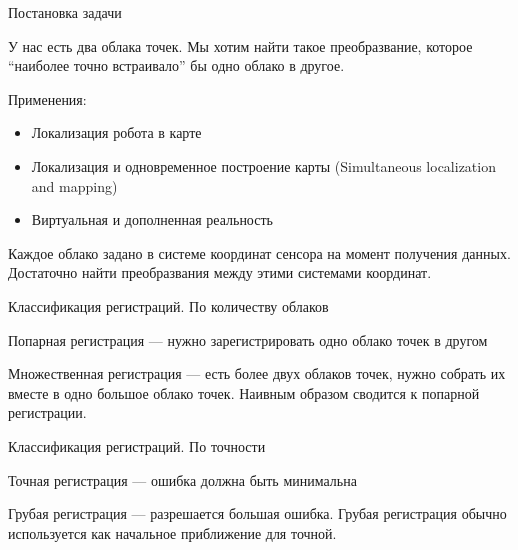 \documentclass[6pt,pdf,utf8,russian]{beamer}
\begin{document}
\begin{frame}[fragile]{Постановка задачи}
    \begin{block}{}
        У нас есть два облака точек. Мы хотим найти такое преобразвание,
        которое ``наиболее точно встраивало'' бы одно облако в другое.
    \end{block}

    \pause

    \begin{block}{}
        Применения:
        \begin{itemize}
            \item Локализация робота в карте
            \item Локализация и одновременное построение карты (Simultaneous localization and mapping)
            \item Виртуальная и дополненная реальность
        \end{itemize}
    \end{block}

    \pause

    \begin{block}{}
        Каждое облако задано в системе координат сенсора на момент
        получения данных. Достаточно найти преобразвания между этими системами координат.
    \end{block}

\end{frame}


\begin{frame}[fragile]{Классификация регистраций. По количеству облаков}
    \begin{block}{}
        Попарная регистрация --- нужно зарегистрировать одно облако точек в другом
    \end{block}

    \pause

    \begin{block}{}
        Множественная регистрация --- есть более двух облаков точек, нужно собрать их вместе в одно
        большое облако точек. Наивным образом сводится к попарной регистрации.
    \end{block}

\end{frame}

\begin{frame}[fragile]{Классификация регистраций. По точности}
    \begin{block}{}
        Точная регистрация --- ошибка должна быть минимальна
    \end{block}

    \pause

    \begin{block}{}
        Грубая регистрация --- разрешается большая ошибка. Грубая регистрация обычно используется
        как начальное приближение для точной.
    \end{block}
\end{frame}
\end{document}
